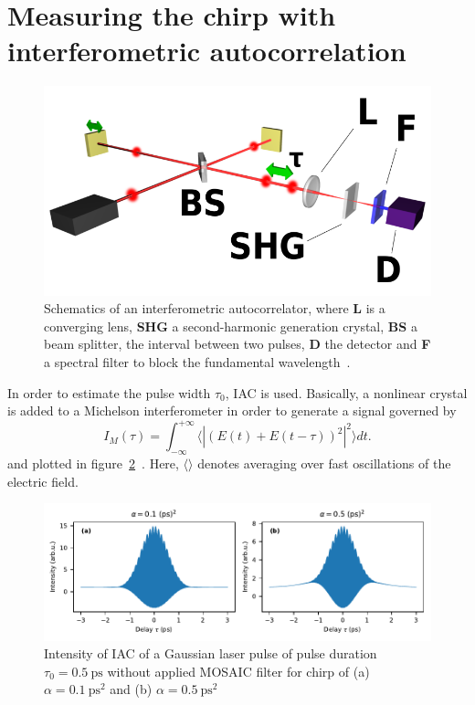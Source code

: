 \section{Measuring the chirp with interferometric autocorrelation}
\begin{figure}[H]
	\centering
	\includegraphics[width=0.6\linewidth]{figures/chirp/Optical-interferometric-autocorrelation-setup.png}
	\caption[Schematics of an interferometric autocorrelator]{Schematics of an interferometric autocorrelator, where \textbf{L} is a converging lens, \textbf{SHG} a second-harmonic generation crystal, \textbf{BS} a beam splitter, \bm{$\tau$} the interval between two pulses, \textbf{D} the detector and \textbf{F} a spectral filter to block the fundamental wavelength~\cite{noauthor_optical_nodate}.}
	\label{fig:optical-field-autocorrelation-setup}
\end{figure}
In order to estimate the pulse width $\tau_0$, \ac{IAC} is used.
Basically, a nonlinear crystal is added to a Michelson interferometer in order to generate a signal governed by
\begin{equation}
\label{eq:i-m-integral}
I_M(\tau) = \int_{-\infty}^{+\infty}\langle|(E(t)+E(t-\tau))^2|^2\rangle dt.
\end{equation}
and plotted in figure~\ref{fig:imgausschirpwithoutslitwithoutmosaic}~\cite{diels_ultrashort_2006}.
Here, $\langle \rangle$ denotes averaging over fast oscillations of the electric field.
\begin{figure}[H]
	\centering
	\includegraphics[width=\linewidth]{figures/chirp/plots/I_M_gauss_chirp_without_slit_without_MOSAIC}
	\caption{Intensity of IAC of a Gaussian laser pulse of pulse duration $\tau_0=\SI{0.5}{\pico \second}$ without applied MOSAIC filter for chirp of (a) $\alpha = \SI{0.1}{\pico \second \squared}$ and (b) $\alpha = \SI{0.5}{\pico \second \squared}$}
	\label{fig:imgausschirpwithoutslitwithoutmosaic}
\end{figure}
